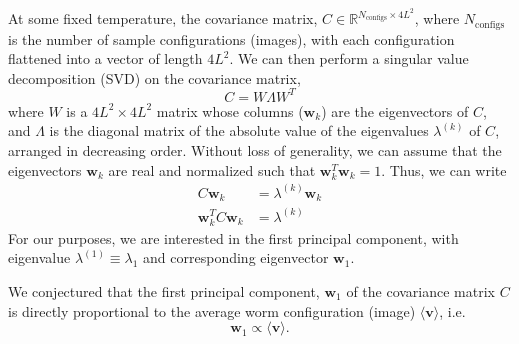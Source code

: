 \documentclass[../main.tex]{subfiles}
\begin{document}
At some fixed temperature, the covariance matrix, $C \in
\mathbb{R}^{N_{\mathrm{configs}}\times4L^2}$, where $N_{\mathrm{configs}}$ is
the number of sample configurations (images), with each configuration flattened
into a vector of length $4L^2$. We can then perform a singular value
decomposition (SVD) on the covariance matrix,
%
\begin{equation}
    C = W\Lambda W^{T}
    \label{svd}
\end{equation}
%
where $W$ is a $4L^2\times 4L^2$ matrix whose columns ($\mathbf{w}_k$) are the
eigenvectors of $C$, and $\Lambda$ is the diagonal matrix of the absolute value
of the eigenvalues $\lambda^{(k)}$ of $C$, arranged in decreasing order.
Without loss of generality, we can assume that the eigenvectors $\mathbf{w}_k$
are real and normalized such that $\mathbf{w}_k^{T} \mathbf{w}_k = 1$. Thus, we
can write
%
\begin{align}
    C \mathbf{w}_k &= \lambda^{(k)} \mathbf{w}_k\\
    \mathbf{w}_k^{T} C \mathbf{w}_k &= \lambda^{(k)}
\end{align}
%
For our purposes, we are interested in the first principal component, with
eigenvalue $\lambda^{(1)} \equiv \lambda_1$ and corresponding eigenvector
$\mathbf{w}_1$.

We conjectured that the first principal component, $\mathbf{w}_1$ of the
covariance matrix $C$ is directly proportional to the average worm
configuration (image) $\langle \mathbf{v} \rangle$, i.e.
%
\begin{equation}
    \mathbf{w}_1 \propto \langle \mathbf{v}\rangle.
    \label{conjecture}
\end{equation}
%
\end{document}
